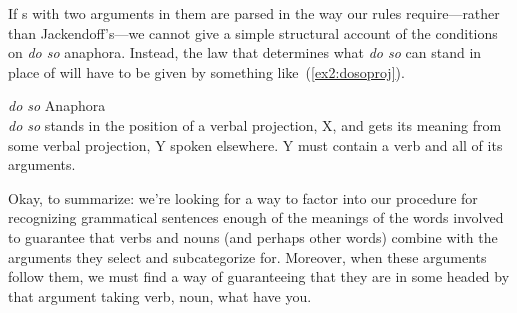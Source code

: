 %
%
%

If s with two arguments in them are parsed in the way our rules require---rather than Jackendoff's---we cannot give a simple structural account of the conditions on \emph{do so} anaphora. Instead, the law that determines what \emph{do so} can stand in place of will have to be given by something like~(\ref{ex2:dosoproj}).
\begin{exe}
	\raggedright
	\ex \label{ex2:dosoproj} \emph{do so} Anaphora\\
	\emph{do so} stands in the position of a verbal projection, X, and gets its meaning from some verbal projection, Y spoken elsewhere. Y must contain a verb and all of its arguments.
\end{exe}

Okay, to summarize: we're looking for a way to factor into our procedure for recognizing grammatical sentences enough of the meanings of the words involved to guarantee that verbs and nouns (and perhaps other words) combine with the arguments they select and subcategorize for. Moreover, when these arguments follow them, we must find a way of guaranteeing that they are in some  headed by that argument taking verb, noun, what have you.

